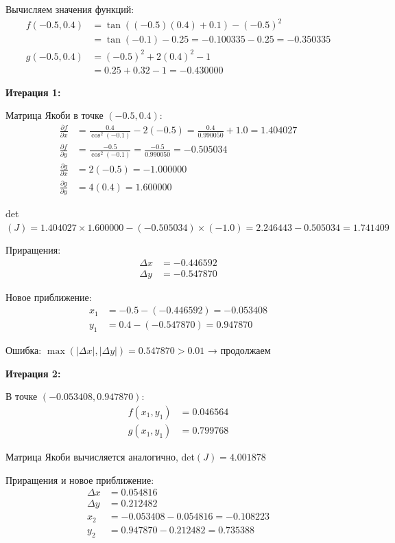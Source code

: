 \documentclass[a4paper,12pt]{article}
\begin{document}
Вычисляем значения функций:
\begin{align*}
f(-0.5, 0.4) &= \tan((-0.5)(0.4) + 0.1) - (-0.5)^2 \\
&= \tan(-0.1) - 0.25 = -0.100335 - 0.25 = -0.350335 \\
g(-0.5, 0.4) &= (-0.5)^2 + 2(0.4)^2 - 1 \\
&= 0.25 + 0.32 - 1 = -0.430000
\end{align*}

\textbf{Итерация 1:}

Матрица Якоби в точке $(-0.5, 0.4)$:
\begin{align*}
\frac{\partial f}{\partial x} &= \frac{0.4}{\cos^2(-0.1)} - 2(-0.5) = \frac{0.4}{0.990050} + 1.0 = 1.404027 \\
\frac{\partial f}{\partial y} &= \frac{-0.5}{\cos^2(-0.1)} = \frac{-0.5}{0.990050} = -0.505034 \\
\frac{\partial g}{\partial x} &= 2(-0.5) = -1.000000 \\
\frac{\partial g}{\partial y} &= 4(0.4) = 1.600000
\end{align*}

det$(J) = 1.404027 \times 1.600000 - (-0.505034) \times (-1.0) = 2.246443 - 0.505034 = 1.741409$

Приращения:
\begin{align*}
\Delta x &= -0.446592 \\
\Delta y &= -0.547870
\end{align*}

Новое приближение:
\begin{align*}
x_1 &= -0.5 - (-0.446592) = -0.053408 \\
y_1 &= 0.4 - (-0.547870) = 0.947870
\end{align*}

Ошибка: $\max(|\Delta x|, |\Delta y|) = 0.547870 > 0.01$ → продолжаем

\textbf{Итерация 2:}

В точке $(-0.053408, 0.947870)$:
\begin{align*}
f(x_1, y_1) &= 0.046564 \\
g(x_1, y_1) &= 0.799768
\end{align*}

Матрица Якоби вычисляется аналогично, det$(J) = 4.001878$

Приращения и новое приближение:
\begin{align*}
\Delta x &= 0.054816 \\
\Delta y &= 0.212482 \\
x_2 &= -0.053408 - 0.054816 = -0.108223 \\
y_2 &= 0.947870 - 0.212482 = 0.735388
\end{align*}
\end{document}
